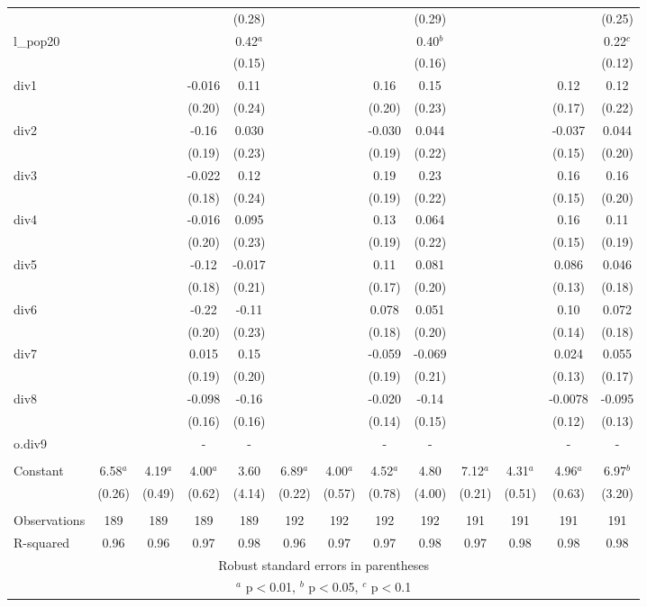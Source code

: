 \documentclass[]{article}
\begin{document}
\begin{tabular}{lcccccccccccc}
 &  &  &  & (0.28) &  &  &  & (0.29) &  &  &  & (0.25) \\
l\_pop20 &  &  &  & 0.42$^a$ &  &  &  & 0.40$^b$ &  &  &  & 0.22$^c$ \\
 &  &  &  & (0.15) &  &  &  & (0.16) &  &  &  & (0.12) \\
div1 &  &  & -0.016 & 0.11 &  &  & 0.16 & 0.15 &  &  & 0.12 & 0.12 \\
 &  &  & (0.20) & (0.24) &  &  & (0.20) & (0.23) &  &  & (0.17) & (0.22) \\
div2 &  &  & -0.16 & 0.030 &  &  & -0.030 & 0.044 &  &  & -0.037 & 0.044 \\
 &  &  & (0.19) & (0.23) &  &  & (0.19) & (0.22) &  &  & (0.15) & (0.20) \\
div3 &  &  & -0.022 & 0.12 &  &  & 0.19 & 0.23 &  &  & 0.16 & 0.16 \\
 &  &  & (0.18) & (0.24) &  &  & (0.19) & (0.22) &  &  & (0.15) & (0.20) \\
div4 &  &  & -0.016 & 0.095 &  &  & 0.13 & 0.064 &  &  & 0.16 & 0.11 \\
 &  &  & (0.20) & (0.23) &  &  & (0.19) & (0.22) &  &  & (0.15) & (0.19) \\
div5 &  &  & -0.12 & -0.017 &  &  & 0.11 & 0.081 &  &  & 0.086 & 0.046 \\
 &  &  & (0.18) & (0.21) &  &  & (0.17) & (0.20) &  &  & (0.13) & (0.18) \\
div6 &  &  & -0.22 & -0.11 &  &  & 0.078 & 0.051 &  &  & 0.10 & 0.072 \\
 &  &  & (0.20) & (0.23) &  &  & (0.18) & (0.20) &  &  & (0.14) & (0.18) \\
div7 &  &  & 0.015 & 0.15 &  &  & -0.059 & -0.069 &  &  & 0.024 & 0.055 \\
 &  &  & (0.19) & (0.20) &  &  & (0.19) & (0.21) &  &  & (0.13) & (0.17) \\
div8 &  &  & -0.098 & -0.16 &  &  & -0.020 & -0.14 &  &  & -0.0078 & -0.095 \\
 &  &  & (0.16) & (0.16) &  &  & (0.14) & (0.15) &  &  & (0.12) & (0.13) \\
o.div9 &  &  & - & - &  &  & - & - &  &  & - & - \\
 &  &  &  &  &  &  &  &  &  &  &  &  \\
Constant & 6.58$^a$ & 4.19$^a$ & 4.00$^a$ & 3.60 & 6.89$^a$ & 4.00$^a$ & 4.52$^a$ & 4.80 & 7.12$^a$ & 4.31$^a$ & 4.96$^a$ & 6.97$^b$ \\
 & (0.26) & (0.49) & (0.62) & (4.14) & (0.22) & (0.57) & (0.78) & (4.00) & (0.21) & (0.51) & (0.63) & (3.20) \\
 &  &  &  &  &  &  &  &  &  &  &  &  \\
Observations & 189 & 189 & 189 & 189 & 192 & 192 & 192 & 192 & 191 & 191 & 191 & 191 \\
 R-squared & 0.96 & 0.96 & 0.97 & 0.98 & 0.96 & 0.97 & 0.97 & 0.98 & 0.97 & 0.98 & 0.98 & 0.98 \\ \hline
\multicolumn{13}{c}{ Robust standard errors in parentheses} \\
\multicolumn{13}{c}{ $^a$ p$<$0.01, $^b$ p$<$0.05, $^c$ p$<$0.1} \\
\end{tabular}
\end{document}
